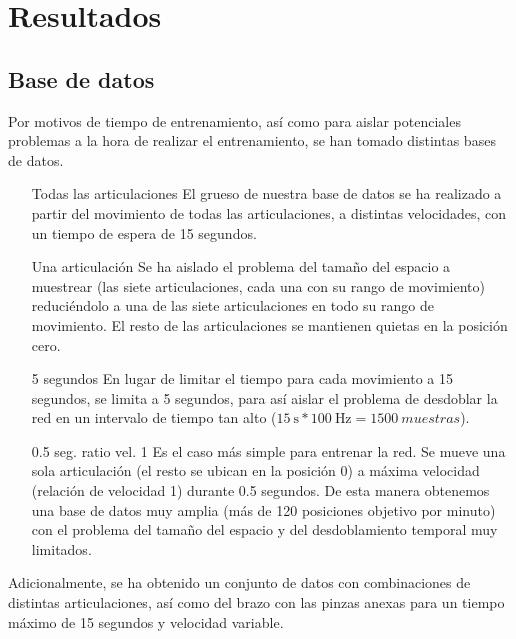 \section{Resultados}
\subsection{Base de datos}
Por motivos de tiempo de entrenamiento, así como para aislar potenciales problemas a la hora de realizar el entrenamiento, se han tomado distintas bases de datos.

\begin{itemize}
\item [Todas las articulaciones] El grueso de nuestra base de datos se ha realizado a partir del movimiento de todas las articulaciones, a distintas velocidades, con un tiempo de espera de 15 segundos.
\item [Una articulación] Se ha aislado el problema del tamaño del espacio a muestrear (las siete articulaciones, cada una con su rango de movimiento) reduciéndolo a una de las siete articulaciones en todo su rango de movimiento. El resto de las articulaciones se mantienen quietas en la posición cero.
\item [5 segundos] En lugar de limitar el tiempo para cada movimiento a 15 segundos, se limita a 5 segundos, para así aislar el problema de desdoblar la red en un intervalo de tiempo tan alto 
($\SI{15}{\second} * \SI{100}{\hertz} = \SI{1500}{muestras}$).
\item [0.5 seg. ratio vel. 1] Es el caso más simple para entrenar la red. Se mueve una sola articulación (el resto se ubican en la posición 0) a máxima velocidad (relación de velocidad 1) durante 0.5 segundos. De esta manera obtenemos una base de datos muy amplia (más de 120 posiciones objetivo por minuto) con el problema del tamaño del espacio y del desdoblamiento temporal muy limitados.
\end{itemize}

Adicionalmente, se ha obtenido un conjunto de datos con combinaciones de distintas articulaciones, así como del brazo con las pinzas anexas para un tiempo máximo de 15 segundos y velocidad variable.